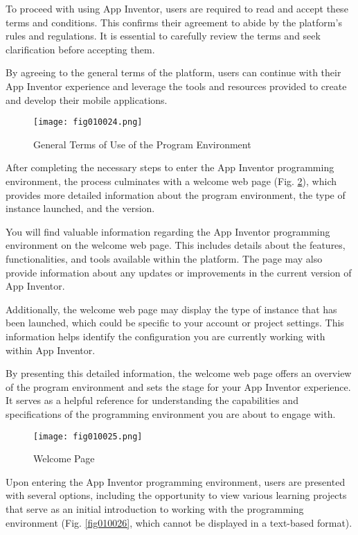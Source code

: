To proceed with using App Inventor, users are required to read and accept these terms and conditions. This confirms their agreement to abide by the platform's rules and regulations. It is essential to carefully review the terms and seek clarification before accepting them.

By agreeing to the general terms of the platform, users can continue with their App Inventor experience and leverage the tools and resources provided to create and develop their mobile applications.

\begin{figure}[H]
   \centering
   \texttt{[image: fig010024.png]}
   \caption{General Terms of Use of the Program Environment}
\label{fig010024}
\end{figure}

After completing the necessary steps to enter the App Inventor programming environment, the process culminates with a welcome web page (Fig. \ref{fig010025}), which provides more detailed information about the program environment, the type of instance launched, and the version.

You will find valuable information regarding the App Inventor programming environment on the welcome web page. This includes details about the features, functionalities, and tools available within the platform. The page may also provide information about any updates or improvements in the current version of App Inventor.

Additionally, the welcome web page may display the type of instance that has been launched, which could be specific to your account or project settings. This information helps identify the configuration you are currently working with within App Inventor.

By presenting this detailed information, the welcome web page offers an overview of the program environment and sets the stage for your App Inventor experience. It serves as a helpful reference for understanding the capabilities and specifications of the programming environment you are about to engage with.

\begin{figure}[H]
   \centering
   \texttt{[image: fig010025.png]}
   \caption{Welcome Page}
\label{fig010025}
\end{figure}

Upon entering the App Inventor programming environment, users are presented with several options, including the opportunity to view various learning projects that serve as an initial introduction to working with the programming environment (Fig. \ref{fig010026}, which cannot be displayed in a text-based format).

